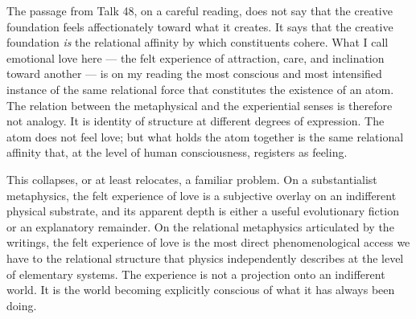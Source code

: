 The passage from Talk 48, on a careful reading, does not say that the
creative foundation feels affectionately toward what it creates.
It says that the creative foundation \emph{is} the relational affinity by
which constituents cohere.
What I call emotional love here --- the felt experience of attraction,
care, and inclination toward another --- is on my reading the most
conscious and most intensified instance of the same relational force that
constitutes the existence of an atom.
The relation between the metaphysical and the experiential senses is
therefore not analogy.
It is identity of structure at different degrees of expression.
The atom does not feel love; but what holds the atom together is the same
relational affinity that, at the level of human consciousness, registers
as feeling.

This collapses, or at least relocates, a familiar problem.
On a substantialist metaphysics, the felt experience of love is a subjective
overlay on an indifferent physical substrate, and its apparent depth is
either a useful evolutionary fiction or an explanatory remainder.
On the relational metaphysics articulated by the \bahai writings, the felt
experience of love is the most direct phenomenological access we have to the
relational structure that physics independently describes at the level of
elementary systems.
The experience is not a projection onto an indifferent world.
It is the world becoming explicitly conscious of what it has always been doing.
